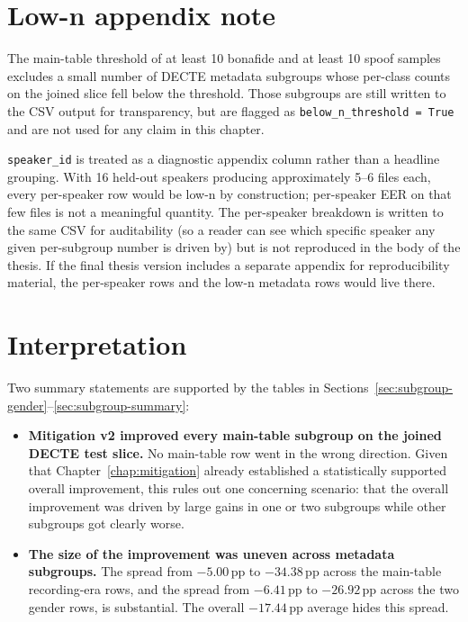\section{Low-n appendix note}
\label{sec:subgroup-low-n}

The main-table threshold of at least 10 bonafide and at least 10
spoof samples excludes a small number of DECTE metadata subgroups
whose per-class counts on the joined slice fell below the
threshold. Those subgroups are still written to the CSV output for
transparency, but are flagged as \texttt{below\_n\_threshold = True} and
are not used for any claim in this chapter.

\texttt{speaker\_id} is treated as a diagnostic appendix column rather
than a headline grouping. With 16 held-out speakers producing
approximately 5--6 files each, every per-speaker row would be low-n
by construction; per-speaker EER on that few files is not a
meaningful quantity. The per-speaker breakdown is written to the
same CSV for auditability (so a reader can see which specific
speaker any given per-subgroup number is driven by) but is not
reproduced in the body of the thesis. If the final thesis
version includes a separate appendix for reproducibility material,
the per-speaker rows and the low-n metadata rows would live there.


\section{Interpretation}
\label{sec:subgroup-interpretation}

Two summary statements are supported by the tables in
Sections~\ref{sec:subgroup-gender}--\ref{sec:subgroup-summary}:

\begin{itemize}
    \item \textbf{Mitigation v2 improved every main-table subgroup on the
        joined DECTE test slice.} No main-table row went in the wrong
        direction. Given that Chapter~\ref{chap:mitigation} already established a
        statistically supported overall improvement, this rules out one
        concerning scenario: that the overall improvement was driven by
        large gains in one or two subgroups while other subgroups got
        clearly worse.
    \item \textbf{The size of the improvement was uneven across metadata
        subgroups.} The spread from $-5.00$\,pp to $-34.38$\,pp across the
        main-table recording-era rows, and the spread from $-6.41$\,pp to
        $-26.92$\,pp across the two gender rows, is substantial. The
        overall $-17.44$\,pp average hides this spread.
\end{itemize}

